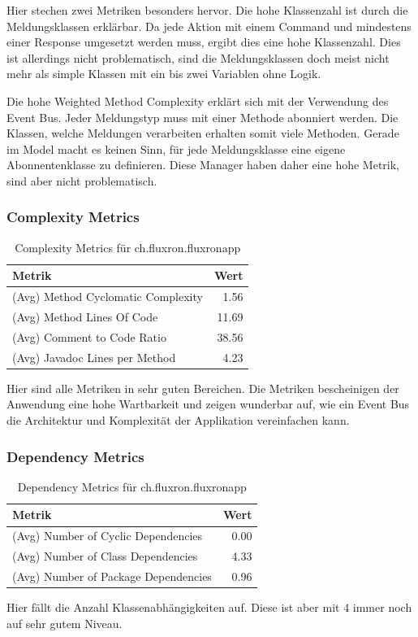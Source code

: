 Hier stechen zwei Metriken besonders hervor. Die hohe Klassenzahl ist durch die Meldungsklassen erklärbar. Da jede Aktion mit einem Command und mindestens einer Response umgesetzt werden muss, ergibt dies eine hohe Klassenzahl. Dies ist allerdings nicht problematisch, sind die Meldungsklassen doch meist nicht mehr als simple Klassen mit ein bis zwei Variablen ohne Logik.

Die hohe Weighted Method Complexity erklärt sich mit der Verwendung des Event Bus. Jeder Meldungstyp muss mit einer Methode abonniert werden. Die Klassen, welche Meldungen verarbeiten erhalten somit viele Methoden. Gerade im Model macht es keinen Sinn, für jede Meldungsklasse eine eigene Abonnentenklasse zu definieren. Diese Manager haben daher eine hohe Metrik, sind aber nicht problematisch.

\subsubsection{Complexity Metrics}

\begin{table}[H]
	\begin{center}
	  \begin{tabular}{ | l | r | }
	    \hline
	    \textbf{Metrik} & \textbf{Wert} \\ \hline
	    (Avg) Method Cyclomatic Complexity & 1.56 \\ \hline
  	    (Avg) Method Lines Of Code & 11.69 \\ \hline
  	    (Avg) Comment to Code Ratio & 38.56 \\ \hline
  	    (Avg) Javadoc Lines per Method & 4.23 \\ \hline
	  \end{tabular}
	  \caption{Complexity Metrics für ch.fluxron.fluxronapp}
  \end{center}
\end{table}

Hier sind alle Metriken in sehr guten Bereichen. Die Metriken bescheinigen der Anwendung eine hohe Wartbarkeit und zeigen wunderbar auf, wie ein Event Bus die Architektur und Komplexität der Applikation vereinfachen kann.

\subsubsection{Dependency Metrics}

\begin{table}[H]
	\begin{center}
	  \begin{tabular}{ | l | r | }
	    \hline
	    \textbf{Metrik} & \textbf{Wert} \\ \hline
	    (Avg) Number of Cyclic Dependencies & 0.00 \\ \hline
  	    (Avg) Number of Class Dependencies & 4.33 \\ \hline
  	    (Avg) Number of Package Dependencies & 0.96 \\ \hline
	  \end{tabular}
	  \caption{Dependency Metrics für ch.fluxron.fluxronapp}
  \end{center}
\end{table}

Hier fällt die Anzahl Klassenabhängigkeiten auf. Diese ist aber mit 4 immer noch auf sehr gutem Niveau.

\pagebreak
